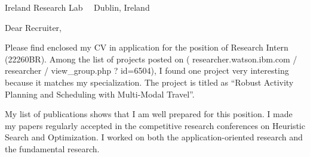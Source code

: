 \documentclass{scrlttr2}
\renewcommand{\\}{\ {\large\textperiodcentered}\ }
\begin{document}

\begin{letter}{ %
Ireland Research Lab\\
Dublin, Ireland
}


\opening{Dear Recruiter,}

\setlength{\parskip}{0.4em}

Please find enclosed my CV in application for the position of Research
 Intern (22260BR). Among the list of projects posted on ({\small
 researcher.watson.ibm.com / researcher / view\_group.php ? id=6504}), I
 found one project very interesting because it matches my
 specialization. The project is titled as ``Robust Activity Planning and
 Scheduling with Multi-Modal Travel''.


My list of publications shows that I am well prepared for this
position. I made my papers regularly accepted in the competitive
research conferences on Heuristic Search and Optimization. I worked on both the
application-oriented research and the fundamental research.


\end{letter}
\end{document}
